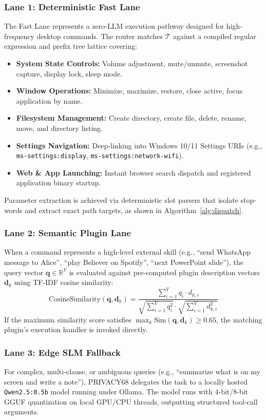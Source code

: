 \documentclass[conference]{IEEEtran}
\begin{document}
\subsubsection{Lane 1: Deterministic Fast Lane}
The Fast Lane represents a zero-LLM execution pathway designed for high-frequency desktop commands. The router matches $\mathcal{T}$ against a compiled regular expression and prefix tree lattice covering:
\begin{itemize}
    \item \textbf{System State Controls:} Volume adjustment, mute/unmute, screenshot capture, display lock, sleep mode.
    \item \textbf{Window Operations:} Minimize, maximize, restore, close active, focus application by name.
    \item \textbf{Filesystem Management:} Create directory, create file, delete, rename, move, and directory listing.
    \item \textbf{Settings Navigation:} Deep-linking into Windows 10/11 Settings URIs (e.g., \texttt{ms-settings:display}, \texttt{ms-settings:network-wifi}).
    \item \textbf{Web \& App Launching:} Instant browser search dispatch and registered application binary startup.
\end{itemize}
Parameter extraction is achieved via deterministic slot parsers that isolate stop-words and extract exact path targets, as shown in Algorithm~\ref{alg:dispatch}.

\subsubsection{Lane 2: Semantic Plugin Lane}
When a command represents a high-level external skill (e.g., ``send WhatsApp message to Alice'', ``play Believer on Spotify'', ``next PowerPoint slide''), the query vector $\mathbf{q} \in \mathbb{R}^{V}$ is evaluated against pre-computed plugin description vectors $\mathbf{d}_k$ using TF-IDF cosine similarity:
\begin{equation}
\text{CosineSimilarity}(\mathbf{q}, \mathbf{d}_k) = \frac{\sum_{i=1}^V q_i \cdot d_{k,i}}{\sqrt{\sum_{i=1}^V q_i^2} \cdot \sqrt{\sum_{i=1}^V d_{k,i}^2}}
\end{equation}
If the maximum similarity score satisfies $\max_k \text{Sim}(\mathbf{q}, \mathbf{d}_k) \ge 0.65$, the matching plugin's execution handler is invoked directly.

\subsubsection{Lane 3: Edge SLM Fallback}
For complex, multi-clause, or ambiguous queries (e.g., ``summarize what is on my screen and write a note''), PRIVACY68 delegates the task to a locally hosted \texttt{Qwen2.5:0.5b} model running under Ollama. The model runs with 4-bit/8-bit GGUF quantization on local GPU/CPU threads, outputting structured tool-call arguments.
\end{document}
